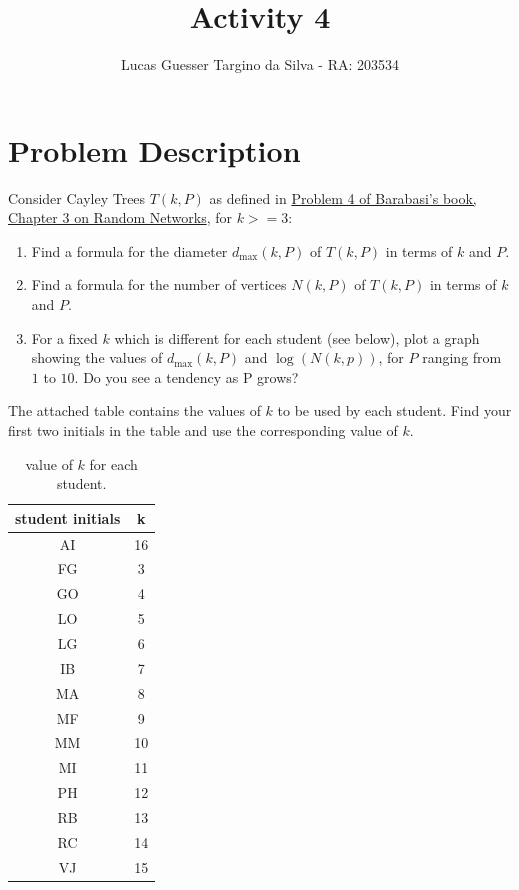 \documentclass{article}
\title{Activity 4}
\author{Lucas Guesser Targino da Silva - RA: 203534}
\begin{document}
\section*{Problem Description}

Consider Cayley Trees $T(k, P)$ as defined in
\href{http://networksciencebook.com/chapter/3#homework3}{Problem 4 of Barabasi's book, Chapter 3 on Random Networks}, for $k >= 3$:

\begin{enumerate}
    \item Find a formula for the diameter $d_{\max}(k, P)$ of $T(k, P)$ in terms of $k$ and $P$.
    \item Find a formula for the number of vertices $N(k, P)$ of $T(k, P)$ in terms of $k$ and $P$.
    \item For a fixed $k$ which is different for each student (see below), plot a graph showing the values of $d_{\max}(k, P)$ and $\log(N(k, p))$, for $P$ ranging from $1$ to $10$.  Do you see a tendency as P grows?
\end{enumerate}

The attached table contains the values of $k$ to be used by each student.  Find your first two initials in the table and use the corresponding value of $k$.

\begin{table}[!ht]
    \centering
    \begin{tabular}{|c|c|}
        \hline
        student initials & k\\\hline\hline
        AI & 16 \\\hline
        FG & 3 \\\hline
        GO & 4 \\\hline
        LO & 5 \\\hline
        LG & 6 \\\hline
        IB & 7 \\\hline
        MA & 8 \\\hline
        MF & 9 \\\hline
        MM & 10 \\\hline
        MI & 11 \\\hline
        PH & 12 \\\hline
        RB & 13 \\\hline
        RC & 14 \\\hline
        VJ & 15 \\\hline
    \end{tabular}
    \caption{value of $k$ for each student.}
\end{table}
\end{document}
